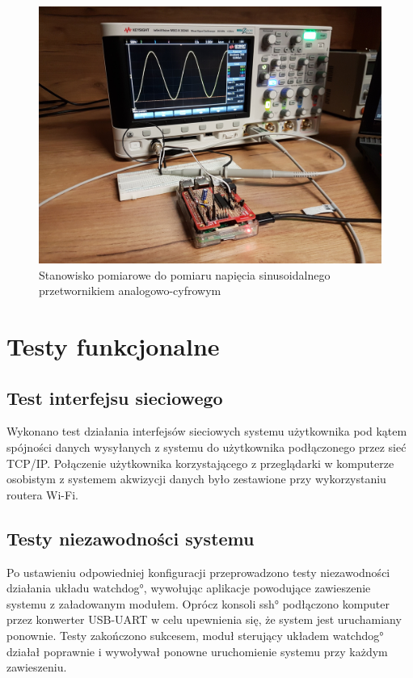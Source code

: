 \begin{figure}[h]
	\centering
		\includegraphics[width=13cm]{stanowisko}
	\caption{Stanowisko pomiarowe do pomiaru napięcia sinusoidalnego przetwornikiem analogowo-cyfrowym} 
	\label{pic:stanowisko}
\end{figure}


\section{Testy funkcjonalne}


\subsection{Test interfejsu sieciowego}

Wykonano test działania interfejsów sieciowych systemu użytkownika pod kątem spójności danych wysyłanych z systemu do użytkownika podłączonego przez sieć TCP/IP. Połączenie użytkownika korzystającego z przeglądarki w komputerze osobistym z systemem akwizycji danych było zestawione przy wykorzystaniu routera Wi-Fi.
 

\subsection{Testy niezawodności systemu}

Po ustawieniu odpowiedniej konfiguracji przeprowadzono testy niezawodności działania układu \ang{watchdog}, wywołując aplikacje powodujące zawieszenie systemu z załadowanym modułem. Oprócz konsoli \ang{ssh} podłączono komputer przez konwerter USB-UART w celu upewnienia się, że system jest uruchamiany ponownie.
Testy zakończono sukcesem, moduł sterujący układem \ang{watchdog} działał poprawnie i wywoływał ponowne uruchomienie systemu przy każdym zawieszeniu. 


